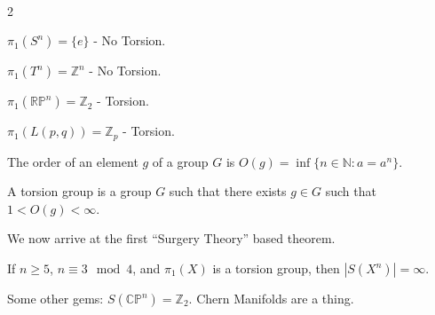 \documentclass[crop=false,class=article,oneside]{standalone}
\begin{document}
        \begin{example}
                \
                \begin{enumerate}
                \end{enumerate}
            \end{example}
        \begin{definition}
                The order of an element $g$ of a group $G$
                is $O(g)=\inf\{n\in\mathbb{N}:a=a^{n}\}$.
            \end{definition}
        \begin{definition}
                A torsion group is a group $G$ such that
                there exists $g\in G$ such that $1<O(g)<\infty$.
            \end{definition}
        We now arrive at the first ``Surgery Theory''
        based theorem.
        \begin{theorem}
            If $n\geq 5$, $n\equiv{3}\mod{4}$,
            and $\pi_{1}(X)$ is a torsion group,
            then $|S(X^{n})|=\infty$.
        \end{theorem}
        Some other gems:
        $S(\mathbb{C}\mathbb{P}^{n})=\mathbb{Z}_{2}$.
        Chern Manifolds are a thing.
\end{document}
